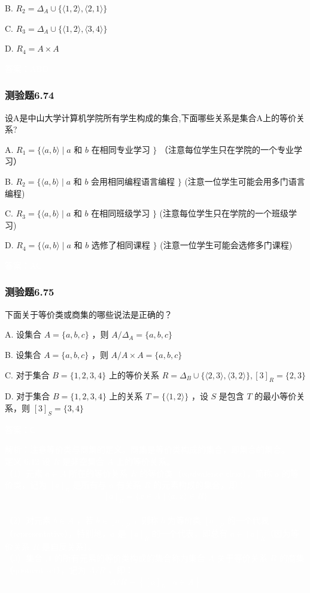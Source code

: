 \documentclass[UTF8, heading=true]{ctexart}
\begin{document}
B. $R_2=\Delta_A \cup\{\langle 1,2\rangle,\langle 2,1\rangle\}$

C. 
$R_3=\Delta_A \cup\{\langle 1,2\rangle,\langle 3,4\rangle\}$

D. $R_4=A \times A$

\textcolor{white}{答案：ABD}



\subsubsection{测验题6.74}

设A是中山大学计算机学院所有学生构成的集合,下面哪些关系是集合A上的等价关系?

A. $R_1=\{\langle a, b\rangle \mid a$ 和 $b$ 在相同专业学习 $\}$ （注意每位学生只在学院的一个专业学习）

B. $R_2=\{\langle a, b\rangle \mid a$ 和 $b$ 会用相同编程语言编程 $\}$ (注意一位学生可能会用多门语言编程)

C. $R_3=\{\langle a, b\rangle \mid a$ 和 $b$ 在相同班级学习 $\}$ (注意每位学生只在学院的一个班级学习)

D. $R_4=\{\langle a, b\rangle \mid a$ 和 $b$ 选修了相同课程 $\}$ (注意一位学生可能会选修多门课程)

\textcolor{white}{答案：AC}

\subsubsection{测验题6.75}

下面关于等价类或商集的哪些说法是正确的？

A. 设集合 $A=\{a, b, c\}$ ，则 $A / \Delta_A=\{a, b, c\}$

B. 设集合 $A=\{a, b, c\}$ ，则 $A / A \times A=\{a, b, c\}$

C. 对于集合 $B=\{1,2,3,4\}$ 上的等价关系 $R=\Delta_B \cup\{\langle 2,3\rangle,\langle 3,2\rangle\},[3]_R=\{2,3\}$

D. 对于集合 $B=\{1,2,3,4\}$ 上的关系 $T=\{\langle 1,2\rangle\}$ ，设 $S$ 是包含 $T$ 的最小等价关系，则 $[3]_S=\{3,4\}$

\textcolor{white}{答案：C}

\textcolor{white}{解析：注意等价类与商集的定义。商集是等价类构成的集合，即集合的集合。\\ \indent
定义 6.12 设 $R$ 是非空集合 $A$ 上的等价关系。\\ \indent
（1）元素 $a \in A$ 所在的等价关系 $R$ 的等价类（equivalence class），简称 $a$ 的等价类，记为 $[a]_R$ 是所有与 $a$ 有关系 $R$ 的元素构成的集合，即：
$$
[a]_R=\{x \in A \mid\langle a, x\rangle \in R\}
$$
\\ \indent（2）对元素 $b \in A$ ，若 $b \in[a]_R$ ，则称 $b$ 为等价类 $[a]_R$ 的一个代表（representative），特别地，$a$ 是 $[a]_R$ 的一个代表，即总有 $a \in[a]_R$（因为等价关系 $R$ 是自反关系）。
\\ \indent（3）集合 $A$ 的所有元素的等价类构成的集合称为集合 $A$ 关于等价关系 $R$ 的商集（quotient set），记为 $A / R$ ，即：
$$
A / R=\left\{[a]_R \mid a \in A\right\}
$$
}
\end{document}
